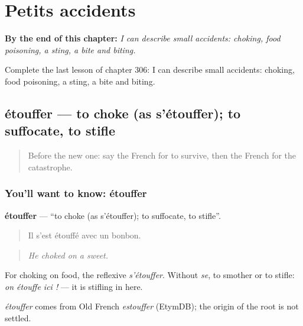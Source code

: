 
\chapter{Petits accidents}
\label{ch:fr-petits-accidents}

\begin{chapteropening}
\textbf{By the end of this chapter:} \emph{I can describe small accidents: choking, food poisoning, a sting, a bite and biting.}

Complete the last lesson of chapter 306: I can describe small accidents: choking, food poisoning, a sting, a bite and biting.
\end{chapteropening}

\section[étouffer]{étouffer — to choke (as s'étouffer); to suffocate, to stifle}

\label{lesson:FR-C306-etouffer}



\begin{quote}
Before the new one: say the French for to survive, then the French for the catastrophe.
\end{quote}

\subsection*{You'll want to know: étouffer}
\textbf{étouffer} — \textquotedblleft{}to choke (as s'étouffer); to suffocate, to stifle\textquotedblright{}.

\begin{quote}
Il s'est étouffé avec un bonbon.
\end{quote}

\begin{quote}
\emph{He choked on a sweet.}
\end{quote}

For choking on food, the reflexive \emph{s'étouffer}. Without \emph{se}, to smother or to stifle: \emph{on étouffe ici !} — it is stifling in here.

\begin{cousinweb}
\emph{étouffer} comes from Old French \emph{estouffer} (EtymDB); the origin of the root is not settled.
\end{cousinweb}

